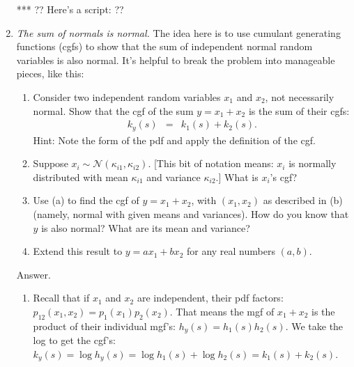 \begin{enumerate}
*** ?? Here's a script:  ??



\item {\it The sum of normals is normal.\/}
The idea here is to use cumulant generating functions (cgfs)
to show that the sum of independent normal random variables is also normal.
It's helpful to break the problem into manageable pieces, like this:
\begin{enumerate}
\item Consider two independent random variables $x_1$ and $x_2$,
    not necessarily normal.
    Show that the cgf of the sum $y = x_1 + x_2$ is the sum of their cgfs:
\begin{eqnarray*}
	k_y(s) &=& k_1(s) + k_2(s) .
\end{eqnarray*}
Hint: Note the form of the pdf and apply the definition of the cgf.

\item Suppose $x_i \sim \mathcal{N}(\kappa_{i1}, \kappa_{i2})$.
[This bit of notation means:   $x_i$ is normally distributed with
mean $\kappa_{i1}$ and variance $\kappa_{i2}$.]
What is $x_i$'s cgf?

\item Use (a) to find the cgf of $y = x_1 + x_2$,
with $(x_1,x_2)$ as described in (b) (namely, normal with given means and variances).
How do you know that $y$ is also normal?  What are its mean and variance?

\item Extend this result to $y = a x_1 + b x_2$ for any real numbers $(a,b)$.
\end{enumerate}
%
Answer.
\begin{enumerate}
\item Recall that if $x_1$ and $x_2$ are independent, their pdf factors:
$ p_{12}(x_1,x_2) = p_1(x_1) p_2(x_2) $.
That means the mgf of $x_1+x_2$ is the product of their individual mgf's:
$ h_y(s) = h_1(s) h_2(s) $.
We take the log to get the cgf's:
$ k_y(s) = \log h_y(s) = \log h_1(s) + \log h_2(s) = k_1(s) + k_2(s) $.


\end{enumerate}
\end{enumerate}
